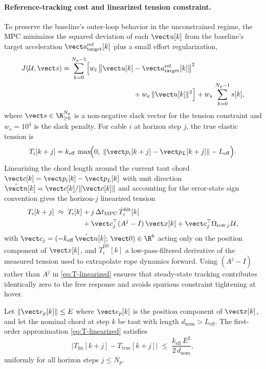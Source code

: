 \paragraph{Reference-tracking cost and linearized tension constraint.} To preserve the baseline's outer-loop behavior in the unconstrained regime, the MPC minimizes the squared deviation of each $\vect u[k]$ from the baseline's target acceleration $\vect a_{\mathrm{target}}^{\mathrm{ref}}[k]$ plus a small effort regularization,
\begin{align}
\label{eq:mpc-cost}
  J(\mathcal{U}, \vect s)
    = \sum_{k=0}^{N_p-1}\Bigl[
        w_t\,\bigl\|\vect u[k] &-
                     \vect a_{\mathrm{target}}^{\mathrm{ref}}[k]
                     \bigr\|^2
        \\
      &+ w_e\,\|\vect u[k]\|^2
      \Bigr]+ w_s\,\sum_{k=0}^{N_p-1} s[k],\nonumber
\end{align}
where $\vect s \in \R_{\ge 0}^{N_p}$ is a non-negative slack vector for the tension constraint and $w_s = 10^4$ is the slack penalty. For cable $i$ at horizon step $j$, the true elastic tension is
\begin{equation}
  T_i[k+j]
    = k_{\mathrm{eff}}\,\max\!\Bigl(0,\;
        \|\vect p_i[k+j] - \vect p_L[k+j]\| - L_{\mathrm{eff}}
      \Bigr).
  \label{eq:T-true}
\end{equation}
Linearizing the chord length around the current taut chord $\vect c[k] = \vect p_i[k] - \vect p_L[k]$ with unit direction $\hat{\vect n}[k] = \vect c[k]/\|\vect c[k]\|$ and accounting for the error-state sign convention gives the horizon-$j$ linearized tension
\begin{align}
\label{eq:T-linearized}
  T_i[k+j] \;\approx\;
    T_i[k]
    &+ j\,\Delta t_{\mathrm{MPC}}\,\dot T_i^{\mathrm{filt}}[k]\\
    &+ \vect c_j^\top (A^j - I)\,\vect x[k]+ \vect c_j^\top \Omega_{\mathrm{row}\,j}\,\mathcal{U},\nonumber
\end{align}
with $\vect c_j = (-k_{\mathrm{eff}}\,\hat{\vect n}[k];\, \vect 0) \in \R^6$ acting only on the position component of $\vect x[k]$, and $\dot T_i^{\mathrm{filt}}[k]$ a low-pass-filtered derivative of the measured tension used to extrapolate rope dynamics forward. Using $(A^j - I)$ rather than $A^j$ in \eqref{eq:T-linearized} ensures that steady-state tracking contributes identically zero to the free response and avoids spurious constraint tightening at hover.

\begin{theorem}
\label{thm:mpc-lin}
Let $\|\vect e_p[k]\| \le E$ where $\vect e_p[k]$ is the position component of $\vect x[k]$, and let the nominal chord at step $k$ be taut with length $d_{\mathrm{nom}} > L_{\mathrm{eff}}$. The
first-order approximation \eqref{eq:T-linearized} satisfies
\begin{equation}
  \bigl|T_{\mathrm{lin}}[k+j] - T_{\mathrm{true}}[k+j]\bigr|
    \;\le\;
    \frac{k_{\mathrm{eff}}\,E^2}{2\,d_{\mathrm{nom}}},
\end{equation}
uniformly for all horizon steps $j \le N_p$.
\end{theorem}

